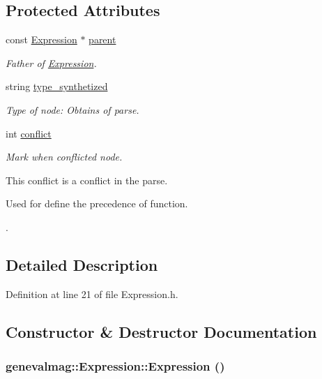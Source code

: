 \subsection*{Protected Attributes}
\begin{CompactItemize}
\item 
const \hyperlink{classgenevalmag_1_1Expression}{Expression} $\ast$ \hyperlink{classgenevalmag_1_1Expression_2de0ee2801347dfd9e7b8a3a99d93233}{parent}
\begin{CompactList}\small\item\em Father of \hyperlink{classgenevalmag_1_1Expression}{Expression}. \item\end{CompactList}\item 
string \hyperlink{classgenevalmag_1_1Expression_449dcb5bce7eb0d3c61ef6d468e6460b}{type\_\-synthetized}
\begin{CompactList}\small\item\em Type of node: Obtains of parse. \item\end{CompactList}\item 
int \hyperlink{classgenevalmag_1_1Expression_2770b2edf303704e36bfecfea77fb177}{conflict}
\begin{CompactList}\small\item\em Mark when conflicted node.\par
 This conflict is a conflict in the parse.\par
 Used for define the precedence of function.\par
. \item\end{CompactList}\end{CompactItemize}


\subsection{Detailed Description}


Definition at line 21 of file Expression.h.

\subsection{Constructor \& Destructor Documentation}
\hypertarget{classgenevalmag_1_1Expression_249f080918dd3203c7dfc8e9e691bc50}{
\subsubsection[{Expression}]{\setlength{\rightskip}{0pt plus 5cm}genevalmag::Expression::Expression ()}}
\label{classgenevalmag_1_1Expression_249f080918dd3203c7dfc8e9e691bc50}


